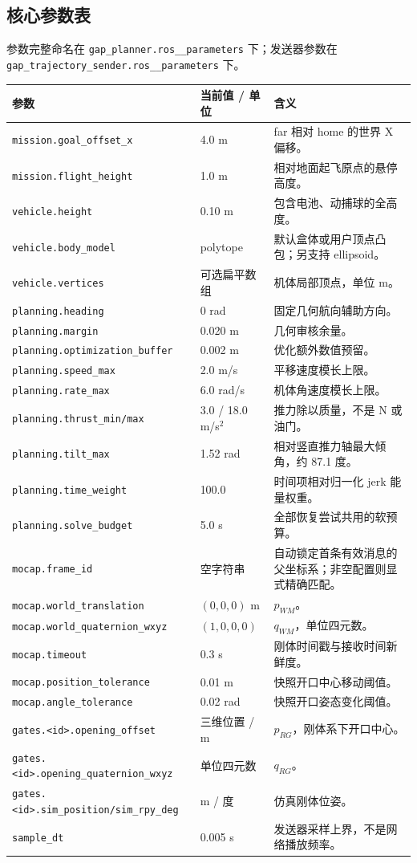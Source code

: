\documentclass[UTF8,fontset=fandol,a4paper,10pt]{ctexart}
\newcommand{\code}[1]{{\small\nolinkurl{#1}}}
\begin{document}
\subsection{核心参数表}
参数完整命名在 \code{gap_planner.ros__parameters} 下；发送器参数在 \code{gap_trajectory_sender.ros__parameters} 下。
\begin{longtable}{@{}p{58mm}p{31mm}p{69mm}@{}}
\toprule 参数 & 当前值 / 单位 & 含义\\\midrule\endhead
\code{mission.goal_offset_x} & 4.0 m & far 相对 home 的世界 X 偏移。\\
\code{mission.flight_height} & 1.0 m & 相对地面起飞原点的悬停高度。\\
\code{vehicle.height} & 0.10 m & 包含电池、动捕球的全高度。\\
\code{vehicle.body_model} & polytope & 默认盒体或用户顶点凸包；另支持 ellipsoid。\\
\code{vehicle.vertices} & 可选扁平数组 & 机体局部顶点，单位 m。\\
\code{planning.heading} & 0 rad & 固定几何航向辅助方向。\\
\code{planning.margin} & 0.020 m & 几何审核余量。\\
\code{planning.optimization_buffer} & 0.002 m & 优化额外数值预留。\\
\code{planning.speed_max} & 2.0 m/s & 平移速度模长上限。\\
\code{planning.rate_max} & 6.0 rad/s & 机体角速度模长上限。\\
\code{planning.thrust_min/max} & 3.0 / 18.0 m/s$^2$ & 推力除以质量，不是 N 或油门。\\
\code{planning.tilt_max} & 1.52 rad & 相对竖直推力轴最大倾角，约 87.1 度。\\
\code{planning.time_weight} & 100.0 & 时间项相对归一化 jerk 能量权重。\\
\code{planning.solve_budget} & 5.0 s & 全部恢复尝试共用的软预算。\\
\code{mocap.frame_id} & 空字符串 & 自动锁定首条有效消息的父坐标系；非空配置则显式精确匹配。\\
\code{mocap.world_translation} & $(0,0,0)$ m & $p_{WM}$。\\
\code{mocap.world_quaternion_wxyz} & $(1,0,0,0)$ & $q_{WM}$，单位四元数。\\
\code{mocap.timeout} & 0.3 s & 刚体时间戳与接收时间新鲜度。\\
\code{mocap.position_tolerance} & 0.01 m & 快照开口中心移动阈值。\\
\code{mocap.angle_tolerance} & 0.02 rad & 快照开口姿态变化阈值。\\
\code{gates.<id>.opening_offset} & 三维位置 / m & $p_{RG}$，刚体系下开口中心。\\
\code{gates.<id>.opening_quaternion_wxyz} & 单位四元数 & $q_{RG}$。\\
\code{gates.<id>.sim_position/sim_rpy_deg} & m / 度 & 仿真刚体位姿。\\
\code{sample_dt} & 0.005 s & 发送器采样上界，不是网络播放频率。\\\bottomrule
\end{longtable}
\end{document}
